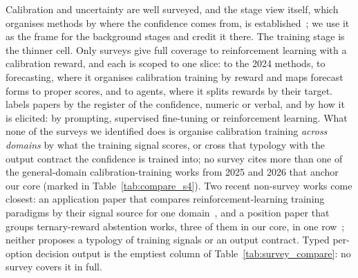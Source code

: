 Calibration and uncertainty are well surveyed, and the stage view itself, which organises methods by
where the confidence comes from, is established~\citep{li2025survey,shorinwa2025survey}; we use it as
the frame for the background stages and credit it there. The training stage is the thinner cell. Only
\nRLRFull surveys give full coverage to reinforcement learning with a calibration reward, and each is
scoped to one slice: \citet{li2025survey} to the 2024 methods, \citet{xu2026llm} to forecasting, where
it organises calibration training by reward and maps forecast forms to proper scores, and
\citet{lin2026uncertainty} to agents, where it splits rewards by their target. \citet{ulmer2025anthropomimetic}
labels papers by the register of the confidence, numeric or verbal, and by how it is elicited: by prompting,
supervised fine-tuning or reinforcement learning. What none of the \nSurveys
surveys we identified does is organise calibration training \emph{across domains} by what the training signal scores,
or cross that typology with the output contract the confidence is trained into; no survey cites more
than one of the \nCoreFourteen general-domain calibration-training works from 2025 and 2026 that anchor
our core (marked in Table~\ref{tab:compare_s4}). Two recent non-survey works come closest: an application
paper that compares reinforcement-learning training paradigms by their signal source for one
domain~\citep{barbosa2026calibrated}, and a position paper that groups ternary-reward abstention works, three of them in
our core, in one row~\citep{ravikumar2026missing}; neither proposes a typology of training signals or an output contract. Typed per-option decision output is the emptiest column of Table~\ref{tab:survey_compare}:
no survey covers it in full.


